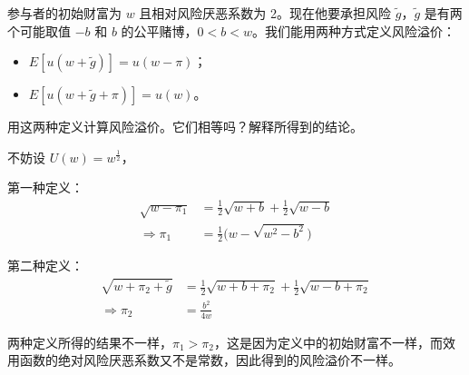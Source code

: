 \begin{problem}
 参与者的初始财富为 $w$ 且相对风险厌恶系数为 2。现在他要承担风险 $\tilde{g}$，$\tilde{g}$ 是有两个可能取值 $-b$ 和 $b$ 的公平赌博，$0<b<w$。我们能用两种方式定义风险溢价：
\begin{itemize}
    \item $E[u(w+\tilde{g})]=u(w-\pi)$；
    \item $E[u(w+\tilde{g}+\pi)]=u(w)$。
\end{itemize}
用这两种定义计算风险溢价。它们相等吗？解释所得到的结论。
\end{problem}
\begin{solution}
不妨设 $U(w)=w^{\frac12}$，

第一种定义：
\[
    \begin{aligned}
        \sqrt{w-\pi_{1}}&=\tfrac12\sqrt{w+b}+\tfrac12\sqrt{w-b}\\
        \Rightarrow\pi_{1}&=\tfrac12\bigl(w-\sqrt{w^{2}-b^{2}}\bigr)
    \end{aligned}
\]

第二种定义：
\[
    \begin{aligned}
        \sqrt{w+\pi_{2}+\tilde{g}}&=\tfrac12\sqrt{w+b+\pi_{2}}+\tfrac12\sqrt{w-b+\pi_{2}}\\
        \Rightarrow\pi_{2}&=\frac{b^{2}}{4w}
    \end{aligned}
\]

两种定义所得的结果不一样，$\pi_{1}>\pi_{2}$，这是因为定义中的初始财富不一样，而效用函数的绝对风险厌恶系数又不是常数，因此得到的风险溢价不一样。
\end{solution}

